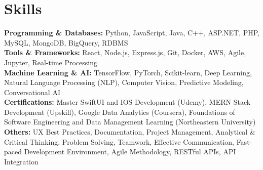 \documentclass[a4paper,10pt]{article}
\begin{document}
\section*{Skills}
\textbf{Programming \& Databases: } Python, JavaScript, Java, C++, ASP.NET, PHP, MySQL, MongoDB, BigQuery, RDBMS \\
\textbf{Tools \& Frameworks:} React, Node.js, Express.js, Git, Docker, AWS, Agile, Jupyter, Real-time Processing \\
\textbf{Machine Learning \& AI: } TensorFlow, PyTorch, Scikit-learn, Deep Learning, Natural Language Processing (NLP), Computer Vision, Predictive Modeling, Conversational AI \\
\textbf{Certifications:} Master SwiftUI and IOS Development (Udemy), MERN Stack Development (Upskill), Google Data Analytics (Coursera), Foundations of Software Engineering and Data Management Learning (Northeastern University) \\
\textbf{Others: }UX Best Practices, Documentation, Project Management, Analytical \& Critical Thinking, Problem Solving, Teamwork, Effective Communication, Fast-paced Development Environment, Agile Methodology, RESTful APIs, API Integration \\

\vspace{-4mm}
\end{document}
